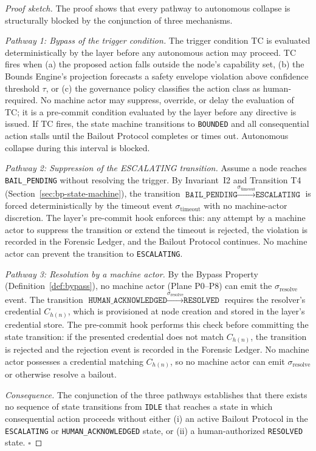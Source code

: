 \begin{proof}[Proof sketch]
The proof shows that every pathway to autonomous collapse is structurally blocked
by the conjunction of three mechanisms.

\medskip
\noindent
\textit{Pathway 1: Bypass of the trigger condition.}
The trigger condition TC is evaluated deterministically by the \bounds{} layer
before any autonomous action may proceed.  TC fires when (a) the proposed action
falls outside the node's capability set, (b) the Bounds Engine's projection
forecasts a safety envelope violation above confidence threshold $\tau$, or (c) the
governance policy classifies the action class as human-required.  No machine actor
may suppress, override, or delay the evaluation of TC; it is a pre-commit
condition evaluated by the \fact{} layer before any directive is issued.
If TC fires, the state machine transitions to \texttt{BOUNDED} and all
consequential action stalls until the Bailout Protocol completes or times out.
Autonomous collapse during this interval is blocked.

\medskip
\noindent
\textit{Pathway 2: Suppression of the ESCALATING transition.}
Assume a node reaches \texttt{BAIL\_PENDING} without resolving the trigger.
By Invariant~I2 and Transition T4 (Section~\ref{sec:bp-state-machine}), the
transition $\texttt{BAIL\_PENDING} \xrightarrow{\sigma_{\text{timeout}}}
\texttt{ESCALATING}$ is forced deterministically by the timeout event
$\sigma_{\text{timeout}}$ with no machine-actor discretion.  The \fact{} layer's
pre-commit hook enforces this: any attempt by a machine actor to suppress the
transition or extend the timeout is rejected, the violation is recorded in the
Forensic Ledger, and the Bailout Protocol continues.  No machine actor can
prevent the transition to \texttt{ESCALATING}.

\medskip
\noindent
\textit{Pathway 3: Resolution by a machine actor.}
By the Bypass Property (Definition~\ref{def:bypass}), no machine actor (Plane
P0--P8) can emit the $\sigma_{\text{resolve}}$ event.  The transition
$\texttt{HUMAN\_ACKNOWLEDGED} \xrightarrow{\sigma_{\text{resolve}}}
\texttt{RESOLVED}$ requires the resolver's credential $C_{h(n)}$, which is
provisioned at node creation and stored in the \fact{} layer's credential store.
The pre-commit hook performs this check before committing the state transition:
if the presented credential does not match $C_{h(n)}$, the transition is rejected
and the rejection event is recorded in the Forensic Ledger.  No machine actor
possesses a credential matching $C_{h(n)}$, so no machine actor can emit
$\sigma_{\text{resolve}}$ or otherwise resolve a bailout.

\medskip
\noindent
\textit{Consequence.}
The conjunction of the three pathways establishes that there exists no
sequence of state transitions from \texttt{IDLE} that reaches a state in which
consequential action proceeds without either (i) an active Bailout Protocol in
the \texttt{ESCALATING} or \texttt{HUMAN\_ACKNOWLEDGED} state, or (ii) a
human-authorized \texttt{RESOLVED} state.  $\square$
\end{proof}

